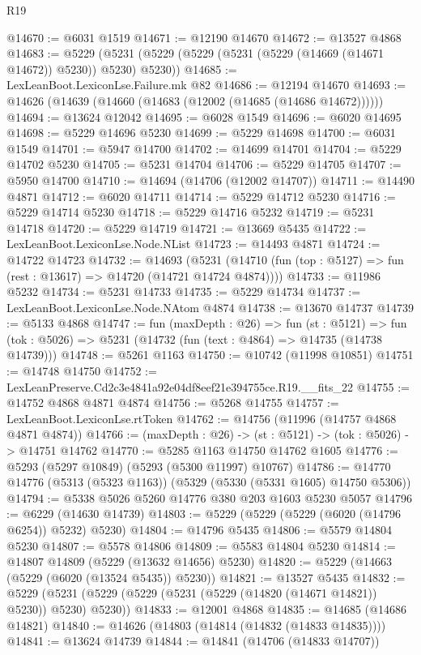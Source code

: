 \begin{lexlean}{R19}
\begin{coremodule}
@14670 := @6031 @1519
@14671 := @12190 @14670
@14672 := @13527 @4868
@14683 := @5229 (@5231 (@5229 (@5229 (@5231 (@5229 (@14669 (@14671 @14672)) @5230)) @5230) @5230))
@14685 := LexLeanBoot.LexiconLse.Failure.mk @82
@14686 := @12194 @14670
@14693 := @14626 (@14639 (@14660 (@14683 (@12002 (@14685 (@14686 @14672))))))
@14694 := @13624 @12042
@14695 := @6028 @1549
@14696 := @6020 @14695
@14698 := @5229 @14696 @5230
@14699 := @5229 @14698
@14700 := @6031 @1549
@14701 := @5947 @14700
@14702 := @14699 @14701
@14704 := @5229 @14702 @5230
@14705 := @5231 @14704
@14706 := @5229 @14705
@14707 := @5950 @14700
@14710 := @14694 (@14706 (@12002 @14707))
@14711 := @14490 @4871
@14712 := @6020 @14711
@14714 := @5229 @14712 @5230
@14716 := @5229 @14714 @5230
@14718 := @5229 @14716 @5232
@14719 := @5231 @14718
@14720 := @5229 @14719
@14721 := @13669 @5435
@14722 := LexLeanBoot.LexiconLse.Node.NList
@14723 := @14493 @4871
@14724 := @14722 @14723
@14732 := @14693
    (@5231 (@14710 (fun (top : @5127) => fun (rest : @13617) => @14720 (@14721 @14724 @4874))))
@14733 := @11986 @5232
@14734 := @5231 @14733
@14735 := @5229 @14734
@14737 := LexLeanBoot.LexiconLse.Node.NAtom @4874
@14738 := @13670 @14737
@14739 := @5133 @4868
@14747 := fun (maxDepth : @26) =>
  fun (st : @5121) =>
  fun (tok : @5026) => @5231 (@14732 (fun (text : @4864) => @14735 (@14738 @14739)))
@14748 := @5261 @1163
@14750 := @10742 (@11998 @10851)
@14751 := @14748 @14750
@14752 := LexLeanPreserve.Cd2c3e4841a92e04df8eef21e394755ce.R19.__fits_22
@14755 := @14752 @4868 @4871 @4874
@14756 := @5268 @14755
@14757 := LexLeanBoot.LexiconLse.rtToken
@14762 := @14756 (@11996 (@14757 @4868 @4871 @4874))
@14766 := (maxDepth : @26) -> (st : @5121) -> (tok : @5026) -> @14751 @14762
@14770 := @5285 @1163 @14750 @14762 @1605
@14776 := @5293 (@5297 @10849) (@5293 (@5300 @11997) @10767)
@14786 := @14770 @14776 (@5313 (@5323 @1163)) (@5329 (@5330 (@5331 @1605) @14750 @5306))
@14794 := @5338 @5026 @5260 @14776 @380 @203 @1603 @5230 @5057
@14796 := @6229 (@14630 @14739)
@14803 := @5229 (@5229 (@5229 (@6020 (@14796 @6254)) @5232) @5230)
@14804 := @14796 @5435
@14806 := @5579 @14804 @5230
@14807 := @5578 @14806
@14809 := @5583 @14804 @5230
@14814 := @14807 @14809 (@5229 (@13632 @14656) @5230)
@14820 := @5229 (@14663 (@5229 (@6020 (@13524 @5435)) @5230))
@14821 := @13527 @5435
@14832 := @5229 (@5231 (@5229 (@5229 (@5231 (@5229 (@14820 (@14671 @14821)) @5230)) @5230) @5230))
@14833 := @12001 @4868
@14835 := @14685 (@14686 @14821)
@14840 := @14626 (@14803 (@14814 (@14832 (@14833 @14835))))
@14841 := @13624 @14739
@14844 := @14841 (@14706 (@14833 @14707))

\end{coremodule}
\end{lexlean}
